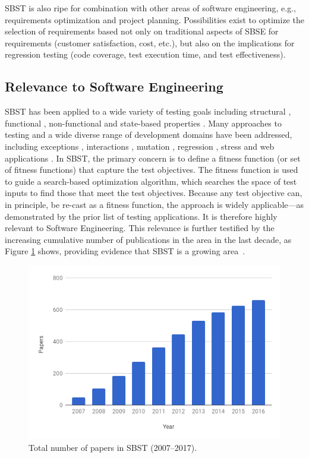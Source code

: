 \documentclass[sigconf,review]{acmart}
\newcommand{\subheading}[1]{\vspace{1mm} \noindent {\bf #1}}
\begin{document}
\subheading{Synergies of SBST and other SE areas.} SBST is also ripe
for combination with other areas of software engineering, e.g.,
requirements optimization and project
planning. %
Possibilities exist to optimize the selection of requirements based
not only on traditional aspects of SBSE for requirements (customer
satisfaction, cost, etc.), but also on the implications for regression
testing (code coverage, test execution time, and test effectiveness).

\subsection{Relevance to Software Engineering}
\label{sec:relevance-se}

SBST has been applied to a wide variety of testing goals including
structural \cite{tonella:classes}, functional \cite{wegener:parking},
non-functional \cite{wegener:verifying} and state-based properties
\cite{joshmh:gecco11}.  Many approaches to testing and a wide diverse
range of development domains have been addressed, including exceptions
\cite{tracey-00}, interactions \cite{cohen:constructing},
mutation \cite{zhan:search-based}, regression \cite{syetal:issta09},
stress \cite{briand-stress-small} and web applications
\cite{Thome14:sec}. In SBST, the primary concern is to define a
fitness function (or set of fitness functions) that capture the test
objectives.  The fitness function is used to guide a search-based
optimization algorithm, which searches the space of test inputs to
find those that meet the test objectives.  Because any test objective
can, in principle, be re-cast as a fitness function, the approach is
widely applicable---as demonstrated by the prior list of testing
applications.  It is therefore highly relevant to Software
Engineering.  This relevance is further testified by the increasing
cumulative number of publications in the area in the last decade, as
Figure \ref{fig:pubs} shows, providing evidence that SBST is a growing
area~\cite{yzmham:sbse-repository}.

\begin{figure}
\centering
\includegraphics[width=.7\columnwidth]{chart.png}
\caption{\label{fig:pubs}Total number of papers in SBST (2007--2017).}
\end{figure}
\end{document}
